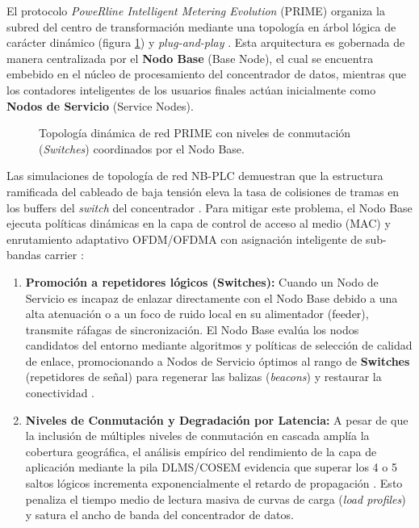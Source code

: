 El protocolo \textit{PoweRline Intelligent Metering Evolution} (PRIME) organiza la subred del centro de transformación mediante una topología en árbol lógica de carácter dinámico (figura \ref{fig:prime_topology}) y \textit{plug-and-play} \cite{5764444}. Esta arquitectura es gobernada de manera centralizada por el \textbf{Nodo Base} (Base Node), el cual se encuentra embebido en el núcleo de procesamiento del concentrador de datos, mientras que los contadores inteligentes de los usuarios finales actúan inicialmente como \textbf{Nodos de Servicio} (Service Nodes).

\begin{figure}[ht]
    \centering
    \caption{Topología dinámica de red PRIME con niveles de conmutación (\textit{Switches}) coordinados por el Nodo Base.}
    \label{fig:prime_topology}
\end{figure}

Las simulaciones de topología de red NB-PLC demuestran que la estructura ramificada del cableado de baja tensión eleva la tasa de colisiones de tramas en los buffers del \textit{switch} del concentrador \cite{8704772}. Para mitigar este problema, el Nodo Base ejecuta políticas dinámicas en la capa de control de acceso al medio (MAC) y enrutamiento adaptativo OFDM/OFDMA con asignación inteligente de sub-bandas carrier \cite{8362574}:
\begin{enumerate}
    \item \textbf{Promoción a repetidores lógicos (Switches):} Cuando un Nodo de Servicio es incapaz de enlazar directamente con el Nodo Base debido a una alta atenuación o a un foco de ruido local en su alimentador (feeder), transmite ráfagas de sincronización. El Nodo Base evalúa los nodos candidatos del entorno mediante algoritmos y políticas de selección de calidad de enlace, promocionando a Nodos de Servicio óptimos al rango de \textbf{Switches} (repetidores de señal) para regenerar las balizas (\textit{beacons}) y restaurar la conectividad \cite{8693361}.
    \item \textbf{Niveles de Conmutación y Degradación por Latencia:} A pesar de que la inclusión de múltiples niveles de conmutación en cascada amplía la cobertura geográfica, el análisis empírico del rendimiento de la capa de aplicación mediante la pila DLMS/COSEM evidencia que superar los 4 o 5 saltos lógicos incrementa exponencialmente el retardo de propagación \cite{7778783}. Esto penaliza el tiempo medio de lectura masiva de curvas de carga (\textit{load profiles}) y satura el ancho de banda del concentrador de datos.
\end{enumerate}

